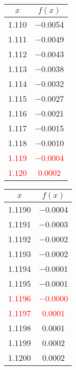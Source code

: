 \documentclass{article}
\begin{document}
\begin{enumerate}
\begin{enumerate}
\begin{tabular}{|c|c|}
            \hline
            $x$   & $f(x)$ \\
            \hline
            \num{1,110} & \num{-0,0054} \\
            \num{1,111} & \num{-0,0049} \\
            \num{1,112} & \num{-0,0043} \\
            \num{1,113} & \num{-0,0038} \\
            \num{1,114} & \num{-0,0032} \\
            \num{1,115} & \num{-0,0027} \\
            \num{1,116} & \num{-0,0021} \\
            \num{1,117} & \num{-0,0015} \\
            \num{1,118} & \num{-0,0010} \\
            \textcolor{red}{\num{1,119}} & \textcolor{red}{\num{-0,0004}} \\
            \textcolor{red}{\num{1,120}} & \textcolor{red}{\num{0,0002}} \\
            \hline
            \end{tabular}\quad
            \begin{tabular}{|c|c|}
            \hline
            $x$   & $f(x)$ \\
            \hline
            \num{1,1190} & \num{-0,0004} \\
            \num{1,1191} & \num{-0,0003} \\
            \num{1,1192} & \num{-0,0002} \\
            \num{1,1193} & \num{-0,0002} \\
            \num{1,1194} & \num{-0,0001} \\
            \num{1,1195} & \num{-0,0001} \\
            \textcolor{red}{\num{1,1196}} & \textcolor{red}{\num{-0,0000}} \\
            \textcolor{red}{\num{1,1197}} & \textcolor{red}{\num{0,0001}} \\
            \num{1,1198} & \num{0,0001} \\
            \num{1,1199} & \num{0,0002} \\
            \num{1,1200} & \num{0,0002} \\
            \hline
            \end{tabular}\quad \\


\end{enumerate}
\end{enumerate}
\end{document}
